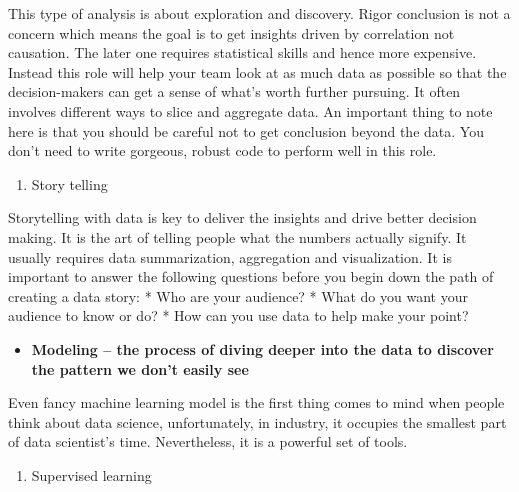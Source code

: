 \documentclass[12pt,]{krantz}
\providecommand{\tightlist}{%
  \setlength{\itemsep}{0pt}\setlength{\parskip}{0pt}}
\theoremstyle{definition}
\theoremstyle{definition}
\theoremstyle{definition}
\theoremstyle{remark}
\begin{document}
This type of analysis is about exploration and discovery. Rigor
conclusion is not a concern which means the goal is to get insights
driven by correlation not causation. The later one requires statistical
skills and hence more expensive. Instead this role will help your team
look at as much data as possible so that the decision-makers can get a
sense of what's worth further pursuing. It often involves different ways
to slice and aggregate data. An important thing to note here is that you
should be careful not to get conclusion beyond the data. You don't need
to write gorgeous, robust code to perform well in this role.

\begin{enumerate}
\def\labelenumi{(\arabic{enumi})}
\setcounter{enumi}{2}
\tightlist
\item
  Story telling
\end{enumerate}

Storytelling with data is key to deliver the insights and drive better
decision making. It is the art of telling people what the numbers
actually signify. It usually requires data summarization, aggregation
and visualization. It is important to answer the following questions
before you begin down the path of creating a data story: * Who are your
audience? * What do you want your audience to know or do? * How can you
use data to help make your point?

\begin{itemize}
\tightlist
\item
  \textbf{Modeling -- the process of diving deeper into the data to
  discover the pattern we don't easily see}
\end{itemize}

Even fancy machine learning model is the first thing comes to mind when
people think about data science, unfortunately, in industry, it occupies
the smallest part of data scientist's time. Nevertheless, it is a
powerful set of tools.

\begin{enumerate}
\def\labelenumi{(\arabic{enumi})}
\tightlist
\item
  Supervised learning
\end{enumerate}
\end{document}

